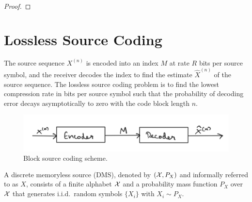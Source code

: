 \documentclass[11pt,a4paper]{article}
\begin{document}
\begin{proof}
    
\end{proof}

\section{Lossless Source Coding}

\begin{problem*}
    The source sequence $X^{(n)}$ is encoded into an index $M$ at rate $R$ bits per source symbol, and the receiver decodes the index to find the estimate $\hat{X}^{(n)}$ of the source sequence. The lossless source coding problem is to find the lowest compression rate in bits per source symbol such that the probability of decoding error decays asymptotically to zero with the code block length $n$.
\end{problem*}

\begin{figure}[ht]
    \centering
    \includegraphics[width=0.7\linewidth]{images/Source_Coding.png}
    \caption{Block source coding scheme.}
    \label{fig:Source_Coding}
\end{figure}

\begin{definition}
    A discrete memoryless source (DMS), denoted by $(\mathcal{X},P_X)$ and informally referred to as $X$, consists of a finite alphabet $\mathcal{X}$ and a probability mass function $P_X$ over $\mathcal{X}$ that generates i.i.d.~random symbols $\{X_i\}$ with $X_i\sim P_X$.
\end{definition}


\end{document}
